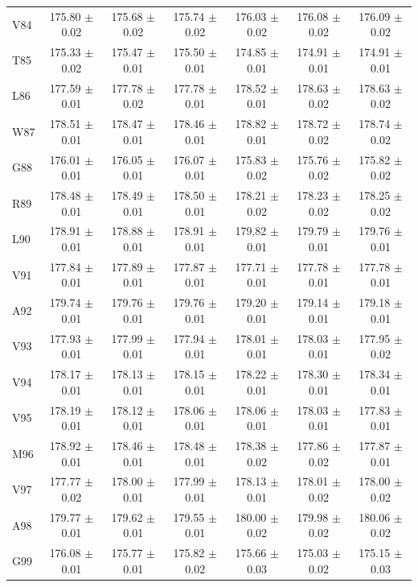 \documentclass[%
 aip,
 amsmath,amssymb,
 preprint,%
]{revtex4-1}
\begin{document}
\begin{center}
\begin{longtable}{l|c|c|c|c|c|c}
V84 & 175.80 $\pm$ 0.02 & 175.68 $\pm$ 0.02 & 175.74 $\pm$ 0.02 & 176.03 $\pm$ 0.02 & 176.08 $\pm$ 0.02 & 176.09 $\pm$ 0.02 \\
T85 & 175.33 $\pm$ 0.02 & 175.47 $\pm$ 0.01 & 175.50 $\pm$ 0.01 & 174.85 $\pm$ 0.01 & 174.91 $\pm$ 0.01 & 174.91 $\pm$ 0.01 \\
L86 & 177.59 $\pm$ 0.01 & 177.78 $\pm$ 0.02 & 177.78 $\pm$ 0.01 & 178.52 $\pm$ 0.01 & 178.63 $\pm$ 0.02 & 178.63 $\pm$ 0.02 \\
W87 & 178.51 $\pm$ 0.01 & 178.47 $\pm$ 0.01 & 178.46 $\pm$ 0.01 & 178.82 $\pm$ 0.01 & 178.72 $\pm$ 0.02 & 178.74 $\pm$ 0.02 \\
G88 & 176.01 $\pm$ 0.01 & 176.05 $\pm$ 0.01 & 176.07 $\pm$ 0.01 & 175.83 $\pm$ 0.02 & 175.76 $\pm$ 0.02 & 175.82 $\pm$ 0.02 \\
R89 & 178.48 $\pm$ 0.01 & 178.49 $\pm$ 0.01 & 178.50 $\pm$ 0.01 & 178.21 $\pm$ 0.02 & 178.23 $\pm$ 0.02 & 178.25 $\pm$ 0.02 \\
L90 & 178.91 $\pm$ 0.01 & 178.88 $\pm$ 0.01 & 178.91 $\pm$ 0.01 & 179.82 $\pm$ 0.01 & 179.79 $\pm$ 0.01 & 179.76 $\pm$ 0.01 \\
V91 & 177.84 $\pm$ 0.01 & 177.89 $\pm$ 0.01 & 177.87 $\pm$ 0.01 & 177.71 $\pm$ 0.01 & 177.78 $\pm$ 0.01 & 177.78 $\pm$ 0.01 \\
A92 & 179.74 $\pm$ 0.01 & 179.76 $\pm$ 0.01 & 179.76 $\pm$ 0.01 & 179.20 $\pm$ 0.01 & 179.14 $\pm$ 0.01 & 179.18 $\pm$ 0.01 \\
V93 & 177.93 $\pm$ 0.01 & 177.99 $\pm$ 0.01 & 177.94 $\pm$ 0.01 & 178.01 $\pm$ 0.01 & 178.03 $\pm$ 0.01 & 177.95 $\pm$ 0.02 \\
V94 & 178.17 $\pm$ 0.01 & 178.13 $\pm$ 0.01 & 178.15 $\pm$ 0.01 & 178.22 $\pm$ 0.01 & 178.30 $\pm$ 0.01 & 178.34 $\pm$ 0.01 \\
V95 & 178.19 $\pm$ 0.01 & 178.12 $\pm$ 0.01 & 178.06 $\pm$ 0.01 & 178.06 $\pm$ 0.01 & 178.03 $\pm$ 0.01 & 177.83 $\pm$ 0.01 \\
M96 & 178.92 $\pm$ 0.01 & 178.46 $\pm$ 0.01 & 178.48 $\pm$ 0.01 & 178.38 $\pm$ 0.02 & 177.86 $\pm$ 0.02 & 177.87 $\pm$ 0.01 \\
V97 & 177.77 $\pm$ 0.02 & 178.00 $\pm$ 0.01 & 177.99 $\pm$ 0.01 & 178.13 $\pm$ 0.01 & 178.01 $\pm$ 0.02 & 178.00 $\pm$ 0.02 \\
A98 & 179.77 $\pm$ 0.01 & 179.62 $\pm$ 0.01 & 179.55 $\pm$ 0.01 & 180.00 $\pm$ 0.02 & 179.98 $\pm$ 0.02 & 180.06 $\pm$ 0.02 \\
G99 & 176.08 $\pm$ 0.01 & 175.77 $\pm$ 0.01 & 175.82 $\pm$ 0.02 & 175.66 $\pm$ 0.03 & 175.03 $\pm$ 0.02 & 175.15 $\pm$ 0.03 \\

\end{longtable}
\end{center}
\end{document}

